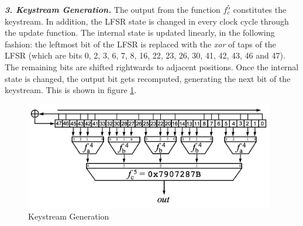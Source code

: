 
%

\noindent \textit{\textbf{3. Keystream Generation.}} The output from the function $f_c^5$ constitutes the keystream. In addition, the LFSR state is changed in every clock cycle through the update function. The internal state is updated linearly, in the following fashion: the leftmost bit of the LFSR is replaced with the \textit{xor} of taps of the LFSR (which are bits 0, 2, 3, 6, 7, 8, 16, 22, 23, 26, 30, 41, 42, 43, 46 and 47). The remaining bits are shifted rightwards to adjacent positions. Once the internal state is changed, the output bit gets recomputed, generating the next bit of the keystream. This is shown in figure \ref{fig:hitag2-3}. 

%

\begin{figure}[ht!]
	\centering
		\includegraphics[width=4.3in]{./figures/hitag2-3.PNG}
	\caption{Keystream Generation}	
	\label{fig:hitag2-3}
\end{figure}

